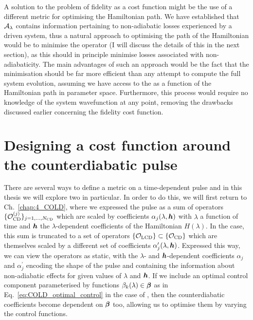A solution to the problem of fidelity as a cost function might be the use of a different metric for optimising the Hamiltonian path. We have established that $\mathcal{A}_{\lambda}$ contains information pertaining to non-adiabatic losses experienced by a driven system, thus a natural approach to optimising the path of the Hamiltonian would be to minimise the  operator (I will discuss the details of this in the next section), as this should in principle minimise losses associated with non-adiabaticity. The main advantages of such an approach would be the fact that  the minimisation should be far more efficient than any attempt to compute the full system evolution, assuming we have access to the  as a function of the Hamiltonian path in parameter space. Furthermore, this process would require no knowledge of the system wavefunction at any point, removing the drawbacks discussed earlier concerning the fidelity cost function.

\section{Designing a cost function around the counterdiabatic pulse}\label{sec:5.2_designing_costfunc_hocd}

There are several ways to define a metric on a time-dependent pulse and in this thesis we will explore two in particular. In order to do this, we will first return to Ch.~\ref{chap:4_COLD}, where we expressed the  pulse as a sum of operators $\{\mathcal{O}_{\rm CD}^{(j)}\}_{j = 1, ..., N_{\rm CD}}$ which are scaled by coefficients $\alpha_j(\lambda, \boldsymbol{h})$ with $\lambda$ a function of time and $\boldsymbol{h}$ the $\lambda$-dependent coefficients of the Hamiltonian $H(\lambda)$. In the  case, this sum is truncated to a set of operators $\{\mathcal{O}_{\rm LCD}\} \subset \{\mathcal{O}_{\rm CD}\}$ which are themselves scaled by a different set of coefficients $\alpha_j^{\prime}(\lambda, \boldsymbol{h})$. Expressed this way, we can view the operators as static, with the $\lambda$- and $\boldsymbol{h}$-dependent coefficients $\alpha_j$ and $\alpha_j^{\prime}$ encoding the shape of the pulse and containing the information about non-adiabatic effects for given values of $\lambda$ and $\boldsymbol{h}$. If we include an optimal control component parameterised by functions $\beta_k(\lambda) \in \boldsymbol{\beta}$ as in Eq.~\eqref{eq:COLD_optimal_control} in the case of , then the counterdiabatic coefficients become dependent on $\boldsymbol{\beta}$ too, allowing us to optimise them by varying the control functions.

